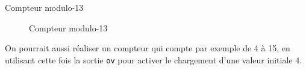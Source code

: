 \documentclass[presentation]{beamer}
\begin{document}
\begin{frame}[label={sec:org7e723c5},fragile]{Compteur modulo-13}
 \begin{figure}[htbp]
\centering

\caption{\label{fig:org2e2dbee}Compteur modulo-13}
\end{figure}

On pourrait aussi réaliser un compteur qui compte par exemple de 4 à
15, en utilisant cette fois la sortie \texttt{ov} pour activer le chargement
d'une valeur initiale 4.
\end{frame}
\end{document}
